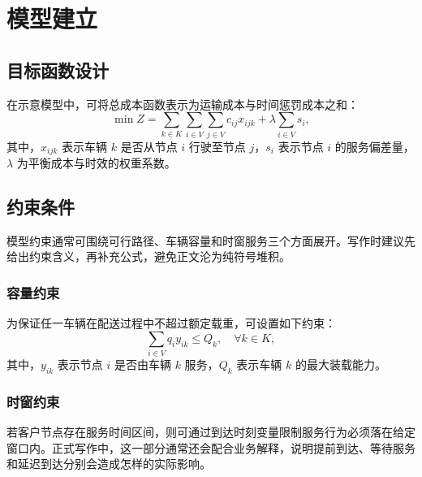 \section{模型建立}

\subsection{目标函数设计}

在示意模型中，可将总成本函数表示为运输成本与时间惩罚成本之和：
\begin{equation}
    \min Z = \sum_{k \in K} \sum_{i \in V} \sum_{j \in V} c_{ij} x_{ijk} + \lambda \sum_{i \in V} s_i ,
    \label{eq:objective}
\end{equation}
其中，$x_{ijk}$ 表示车辆 $k$ 是否从节点 $i$ 行驶至节点 $j$，$s_i$ 表示节点 $i$ 的服务偏差量，$\lambda$ 为平衡成本与时效的权重系数。

\subsection{约束条件}

模型约束通常可围绕可行路径、车辆容量和时窗服务三个方面展开。写作时建议先给出约束含义，再补充公式，避免正文沦为纯符号堆积。

\subsubsection{容量约束}

为保证任一车辆在配送过程中不超过额定载重，可设置如下约束：
\begin{equation}
    \sum_{i \in V} q_i y_{ik} \le Q_k, \quad \forall k \in K ,
    \label{eq:capacity}
\end{equation}
其中，$y_{ik}$ 表示节点 $i$ 是否由车辆 $k$ 服务，$Q_k$ 表示车辆 $k$ 的最大装载能力。

\subsubsection{时窗约束}

若客户节点存在服务时间区间，则可通过到达时刻变量限制服务行为必须落在给定窗口内。正式写作中，这一部分通常还会配合业务解释，说明提前到达、等待服务和延迟到达分别会造成怎样的实际影响。
